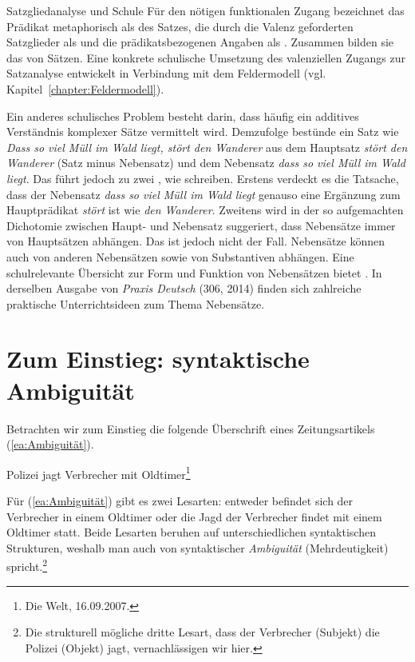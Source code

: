\begin{Exkurs}{Satzgliedanalyse und Schule}
Für den nötigen funktionalen Zugang bezeichnet \citet[63--65]{Boettcher2009EinfSatz} das Prädikat metaphorisch als  des Satzes, die durch die Valenz geforderten Satzglieder als  und die prädikatsbezogenen Angaben als . Zusammen bilden sie das  von Sätzen. Eine konkrete schulische Umsetzung des valenziellen Zugangs zur Satzanalyse  entwickelt \citet[204--211]{Christ2017} in Verbindung mit dem Feldermodell (vgl. Kapitel~\ref{chapter:Feldermodell}).

Ein anderes schulisches Problem besteht darin, dass häufig ein additives Verständnis komplexer Sätze vermittelt wird. Demzufolge bestünde ein Satz wie \textit{Dass so viel Müll im Wald liegt, stört den Wanderer} aus dem Hauptsatz \textit{stört den Wanderer} (Satz minus Nebensatz) und dem Nebensatz \textit{dass so viel Müll im Wald liegt}. Das führt jedoch zu zwei , wie \citet[15--16, 29]{Averintseva-KlischFroemel2022} schreiben. Erstens verdeckt es die Tatsache, dass der Nebensatz \textit{dass so viel Müll im Wald liegt} genauso eine Ergänzung zum Hauptprädikat \textit{stört} ist wie \textit{den Wanderer}. Zweitens wird in der so aufgemachten Dichotomie zwischen Haupt- und Nebensatz suggeriert, dass Nebensätze immer von Hauptsätzen abhängen. Das ist jedoch nicht der Fall. Nebensätze können auch von anderen Nebensätzen sowie von Substantiven abhängen. Eine schulrelevante Übersicht zur Form und Funktion von Nebensätzen bietet \citet{Tophinke2024NeSa}. In derselben Ausgabe von \textit{Praxis Deutsch} (306, 2014) finden sich zahlreiche praktische Unterrichtsideen zum Thema Nebensätze. 

\end{Exkurs}


\section{Zum Einstieg: syntaktische Ambiguität}\label{section:Ambiguität}

Betrachten wir zum Einstieg die folgende Überschrift eines Zeitungsartikels (\ref{ea:Ambiguität}). 

\ea \label{ea:Ambiguität} Polizei jagt Verbrecher mit Oldtimer\footnote{Die Welt, 16.09.2007.}
\z 

Für (\ref{ea:Ambiguität}) gibt es zwei Lesarten: entweder befindet sich der Verbrecher in einem Oldtimer oder die Jagd der Verbrecher findet mit einem Oldtimer statt. Beide Lesarten beruhen auf unterschiedlichen syntaktischen Strukturen, weshalb man auch von syntaktischer \textit{Ambiguität} (Mehrdeutigkeit) spricht.\footnote{Die strukturell mögliche dritte Lesart, dass der Verbrecher (Subjekt) die Polizei (Objekt) jagt, vernachlässigen wir hier.} 

